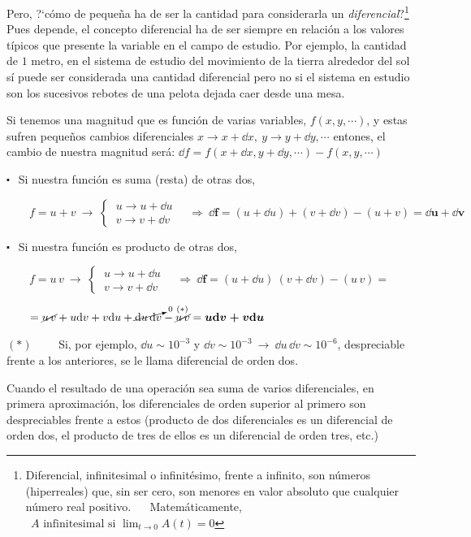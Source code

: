 Pero, ?`cómo de pequeña ha de ser la cantidad para considerarla un \emph{diferencial}?\footnote{Diferencial, infinitesimal o infinitésimo, frente a infinito, son números (hiperreales) que, sin ser cero, son menores  en valor absoluto que cualquier número real positivo. $\quad$ Matemáticamente, $\ \ A \text { infinitesimal si }\displaystyle \lim_{t\to 0}{A(t)}=0$ } Pues depende, el concepto diferencial ha de ser siempre en relación a los valores típicos que presente la variable en el campo de estudio. Por ejemplo, la cantidad de $1$ metro, en el sistema de estudio del movimiento de la tierra alrededor del sol sí puede ser considerada una cantidad diferencial pero no si el sistema en estudio son los sucesivos rebotes de una pelota dejada caer desde una mesa.

Si tenemos una magnitud que es función de varias variables, $f(x,y,\cdots)$, y estas sufren pequeños cambios diferenciales $x\to x+\dd x,\ y\to y+\dd y,\cdots $ entones, el cambio de nuestra magnitud será:
$\dd f=f(x+\dd x ,y+\dd y, \cdots) - f(x,y,\cdots)$


$\centerdot\ \ $ Si nuestra función es suma (resta) de otras dos,

$\qquad f=u+v  \ \to \ \left\{ 
\begin{matrix}  \ u\to u+\dd u \\ \ v\to v+\dd v  \end{matrix} 
\right. \quad \Rightarrow \ \boldsymbol{\dd f} = (u+\dd u)+(v+\dd v)- (u+ v)= \boldsymbol{ \dd u + \dd v }$	

$\centerdot \ \ $ Si nuestra función es producto de otras dos,

$\qquad f=u\, v  \ \to \ \left\{ 
\begin{matrix}  \ u\to u+\dd u \\ \ v\to v+\dd v  \end{matrix} 
\right. \quad \Rightarrow \ \boldsymbol{\dd f} = (u+\dd u)\ (v+\dd v)- (u\,v)= $

$\qquad =\cancel{u\, v} + u\dd v +v\dd u +\cancelto{0\ (*)}{ \dd u\, \dd v } - \cancel{u\, v}= \boldsymbol{ u\dd v +v\dd u}$	

\textcolor{gris}{
$(*) \qquad $ Si, por ejemplo, $\dd u \sim 10^{-3}$ y $\dd v \sim 10^{-3} \ \to \ \dd u\, \dd v  \sim 10^{-6}$, despreciable frente a los anteriores, se le llama diferencial de orden dos.}

Cuando el resultado de una operación sea suma de varios diferenciales, en primera aproximación, los diferenciales de orden superior al primero son despreciables frente a estos (producto de dos diferenciales es un diferencial de orden dos, el producto de tres de ellos es un diferencial de orden tres, etc.)

